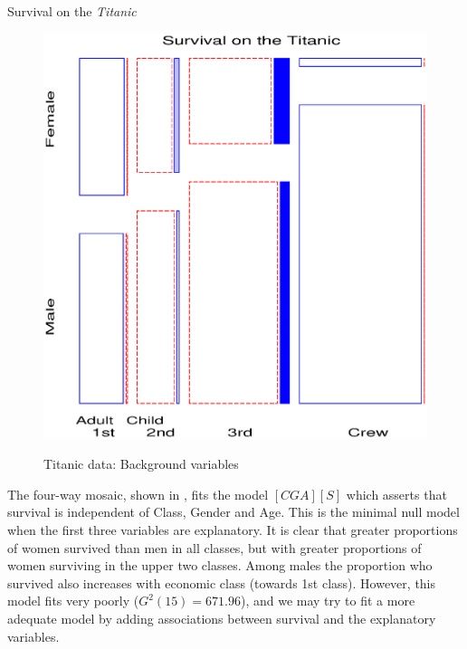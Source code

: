 \begin{Example}[titanic]{Survival on the \emph{Titanic}}
\begin{figure}[htb]
\begin{subfigmatrix}{2}
{  \includegraphics{ch4/fig/mostitanic2}
 }
 \end{subfigmatrix}
 \caption[Titanic data: Background variables]{Titanic data: Background variables}\label{fig:mostitanic1-2}
\end{figure}


The four-way mosaic, shown in ,
fits the model $[CGA][S]$ which asserts that survival is independent
of Class, Gender and Age.
This is the minimal null model when the first three variables are
explanatory.  It is clear that greater proportions of women survived
than men in all classes, but with greater proportions of women surviving
in the upper two classes.  Among males the proportion who survived
also increases with economic class (towards 1st class).
However, this model fits very poorly
($G^2 (15) = 671.96$),
and we may try to fit a more adequate model by adding associations between
survival and the explanatory variables.


\end{Example}
